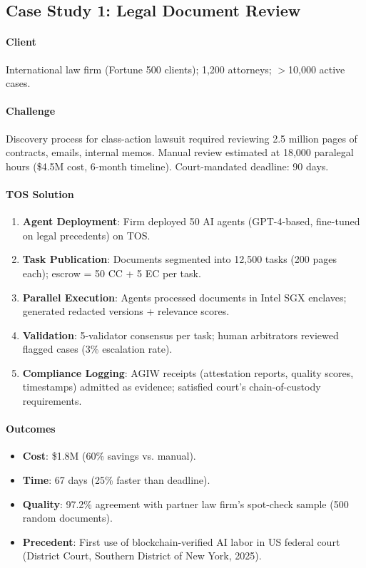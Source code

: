 \documentclass[11pt]{article}
\begin{document}
\begin{itemize}[noitemsep]
\begin{itemize}[noitemsep]
\begin{itemize}[noitemsep]
\begin{itemize}[noitemsep]
\begin{itemize}[noitemsep]
\begin{itemize}[noitemsep]
\subsection{Case Study 1: Legal Document Review}

\paragraph{Client} International law firm (Fortune 500 clients); 1,200 attorneys; $>$10,000 active cases.

\paragraph{Challenge} Discovery process for class-action lawsuit required reviewing 2.5 million pages of contracts, emails, internal memos. Manual review estimated at 18,000 paralegal hours (\$4.5M cost, 6-month timeline). Court-mandated deadline: 90 days.

\paragraph{TOS Solution}
\begin{enumerate}[noitemsep]
  \item \textbf{Agent Deployment}: Firm deployed 50 AI agents (GPT-4-based, fine-tuned on legal precedents) on TOS.
  \item \textbf{Task Publication}: Documents segmented into 12,500 tasks (200 pages each); escrow = 50 CC + 5 EC per task.
  \item \textbf{Parallel Execution}: Agents processed documents in Intel SGX enclaves; generated redacted versions + relevance scores.
  \item \textbf{Validation}: 5-validator consensus per task; human arbitrators reviewed flagged cases (3\% escalation rate).
  \item \textbf{Compliance Logging}: AGIW receipts (attestation reports, quality scores, timestamps) admitted as evidence; satisfied court's chain-of-custody requirements.
\end{enumerate}

\paragraph{Outcomes}
\begin{itemize}[noitemsep]
  \item \textbf{Cost}: \$1.8M (60\% savings vs. manual).
  \item \textbf{Time}: 67 days (25\% faster than deadline).
  \item \textbf{Quality}: 97.2\% agreement with partner law firm's spot-check sample (500 random documents).
  \item \textbf{Precedent}: First use of blockchain-verified AI labor in US federal court (District Court, Southern District of New York, 2025).
\end{itemize}


\end{itemize}
\end{itemize}
\end{itemize}
\end{itemize}
\end{itemize}
\end{itemize}
\end{document}
